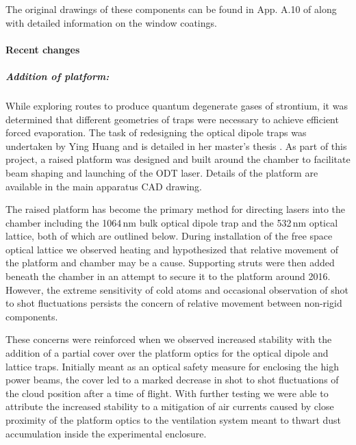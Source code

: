 The original drawings of these components can be found in App. A.10 of \cite{MartinezdeEscolar2010} along with detailed information on the window coatings.

\paragraph{Recent changes}
\subparagraph{Addition of platform:}
While exploring routes to produce quantum degenerate gases of strontium, it was determined that different geometries of traps were necessary to achieve efficient forced evaporation. 
The task of redesigning the optical dipole traps was undertaken by Ying Huang and is detailed in her master's thesis \cite{Huang2013}. 
As part of this project, a raised platform was designed and built around the chamber to facilitate beam shaping and launching of the ODT laser.
Details of the platform are available in the main apparatus CAD drawing.

The raised platform has become the primary method for directing lasers into the chamber including the 1064\,nm bulk optical dipole trap and the 532\,nm optical lattice, both of which are outlined below. 
During installation of the free space optical lattice we observed heating and hypothesized that relative movement of the platform and chamber may be a cause.
Supporting struts were then added beneath the chamber in an attempt to secure it to the platform around 2016.
However, the extreme sensitivity of cold atoms and occasional observation of shot to shot fluctuations persists the concern of relative movement between non-rigid components.

These concerns were reinforced when we observed increased stability with the addition of a partial cover over the platform optics for the optical dipole and lattice traps. 
Initially meant as an optical safety measure for enclosing the high power beams, the cover led to a marked decrease in shot to shot fluctuations of the cloud position after a time of flight.
With further testing we were able to attribute the increased stability to a mitigation of air currents caused by close proximity of the platform optics to the ventilation system meant to thwart dust accumulation inside the experimental enclosure.

